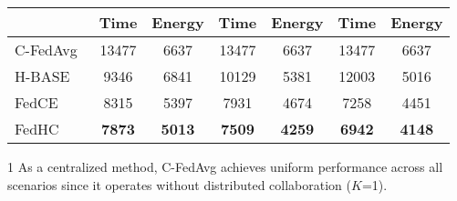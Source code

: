 \begin{table}[tb!]
\begin{threeparttable}
\begin{tabular}{l|ccl|ccl|ccl}
\multicolumn{1}{c|}{}                                                                             & \multicolumn{1}{c}{Time}   & \multicolumn{2}{c|}{Energy}  & Time                      & \multicolumn{2}{c|}{Energy}  & Time                     & \multicolumn{2}{c}{Energy}  \\ \hline
C-FedAvg~\tnote{1}                                                                                          & \multicolumn{1}{c}{13477}     & \multicolumn{2}{c|}{6637}     & \multicolumn{1}{c}{13477}    & \multicolumn{2}{c|}{6637}     & \multicolumn{1}{c}{13477}   & \multicolumn{2}{c}{6637}     \\
H-BASE                                                                                            & \multicolumn{1}{c}{9346}     & \multicolumn{2}{c|}{6841}     & \multicolumn{1}{c}{10129}    & \multicolumn{2}{c|}{5381}     & \multicolumn{1}{c}{12003}   & \multicolumn{2}{c}{5016}     \\
FedCE                                                                                            & \multicolumn{1}{c}{8315}     & \multicolumn{2}{c|}{5397}     & \multicolumn{1}{c}{7931}    & \multicolumn{2}{c|}{4674}     & \multicolumn{1}{c}{7258}   & \multicolumn{2}{c}{4451}     \\
FedHC                                                                                             & \multicolumn{1}{c}{\textbf{7873}}     & \multicolumn{2}{c|}{\textbf{5013}}     & \multicolumn{1}{c}{\textbf{7509}}    & \multicolumn{2}{c|}{\textbf{4259}}     & \multicolumn{1}{c}{\textbf{6942}}   & \multicolumn{2}{c}{\textbf{4148}}     \\ \hline
\end{tabular}
   \begin{tablenotes}
       \footnotesize
       \item[1] As a centralized method, C-FedAvg achieves uniform performance across all scenarios since it operates without distributed collaboration ($K$=1). 
       
     \end{tablenotes}
     \end{threeparttable}
  
\end{table}


